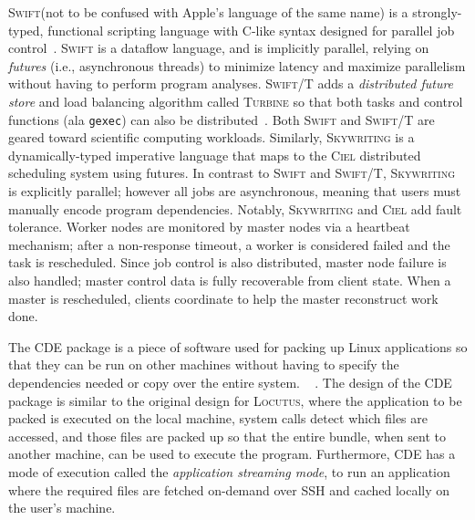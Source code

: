 \documentclass[11pt]{article}
\newcommand{\locutus}{\textsc{Locutus}\xspace}
\newcommand{\cde}{\textsc{CDE}\xspace}
\newcommand{\gexec}{\texttt{gexec}}
\newcommand{\swift}{\textsc{Swift}\xspace}
\newcommand{\swiftt}{\textsc{Swift/T}\xspace}
\newcommand{\turbine}{\textsc{Turbine}\xspace}
\newcommand{\ciel}{\textsc{Ciel}\xspace}
\newcommand{\skywriting}{\textsc{Skywriting}\xspace}
\begin{document}
\swift (not to be confused with Apple's language of the same name) is a strongly-typed, functional scripting language with C-like syntax designed for parallel job control~\cite{WILDE2011633}.  \swift is a dataflow language, and is implicitly parallel, relying on \emph{futures} (i.e., asynchronous threads) to minimize latency and maximize parallelism without having to perform program analyses.  \swiftt adds a \emph{distributed future store} and load balancing algorithm called \turbine so that both tasks and control functions (ala \gexec) can also be distributed~\cite{10.1145/2442516.2442559,6546066}.  Both \swift and \swiftt are geared toward scientific computing workloads.  Similarly, \skywriting is a dynamically-typed imperative language that maps to the \ciel distributed scheduling system using futures.  In contrast to \swift and \swiftt, \skywriting is explicitly parallel; however all jobs are asynchronous, meaning that users must manually encode program dependencies.  Notably, \skywriting and \ciel add fault tolerance.  Worker nodes are monitored by master nodes via a heartbeat mechanism; after a non-response timeout, a worker is considered failed and the task is rescheduled.  Since job control is also distributed, master node failure is also handled; master control data is fully recoverable from client state.  When a master is rescheduled, clients coordinate to help the master reconstruct work done.







The \cde package is a piece of software used for packing up Linux applications so that they can be run on other machines without having to specify the dependencies needed or copy over the entire system. ~\cite{10.1109/MCSE.2012.36} \cite{10.5555/2002181.2002202}. The design of the \cde package is similar to the original design for \locutus, where the application to be packed is executed on the local machine, system calls detect which files are accessed, and those files are packed up so that the entire bundle, when sent to another machine, can be used to execute the program. Furthermore, \cde has a mode of execution called the \textit{application streaming mode}, to run an application where the required files are fetched on-demand over SSH and cached locally on the user's machine.
\end{document}
